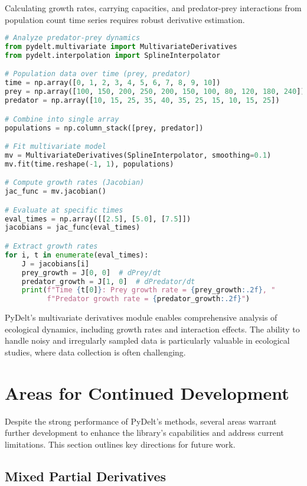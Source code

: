 \documentclass[11pt,a4paper]{article}
\begin{document}
Calculating growth rates, carrying capacities, and predator-prey interactions from population count time series requires robust derivative estimation.

\begin{lstlisting}[language=Python, caption=Ecological modeling example]
# Analyze predator-prey dynamics
from pydelt.multivariate import MultivariateDerivatives
from pydelt.interpolation import SplineInterpolator

# Population data over time (prey, predator)
time = np.array([0, 1, 2, 3, 4, 5, 6, 7, 8, 9, 10])
prey = np.array([100, 150, 200, 250, 200, 150, 100, 80, 120, 180, 240])
predator = np.array([10, 15, 25, 35, 40, 35, 25, 15, 10, 15, 25])

# Combine into single array
populations = np.column_stack([prey, predator])

# Fit multivariate model
mv = MultivariateDerivatives(SplineInterpolator, smoothing=0.1)
mv.fit(time.reshape(-1, 1), populations)

# Compute growth rates (Jacobian)
jac_func = mv.jacobian()

# Evaluate at specific times
eval_times = np.array([[2.5], [5.0], [7.5]])
jacobians = jac_func(eval_times)

# Extract growth rates
for i, t in enumerate(eval_times):
    J = jacobians[i]
    prey_growth = J[0, 0]  # dPrey/dt
    predator_growth = J[1, 0]  # dPredator/dt
    print(f"Time {t[0]}: Prey growth rate = {prey_growth:.2f}, "
          f"Predator growth rate = {predator_growth:.2f}")
\end{lstlisting}

PyDelt's multivariate derivatives module enables comprehensive analysis of ecological dynamics, including growth rates and interaction effects. The ability to handle noisy and irregularly sampled data is particularly valuable in ecological studies, where data collection is often challenging.

\section{Areas for Continued Development}
\label{sec:continued_development}

Despite the strong performance of PyDelt's methods, several areas warrant further development to enhance the library's capabilities and address current limitations. This section outlines key directions for future work.

\subsection{Mixed Partial Derivatives}
\end{document}
